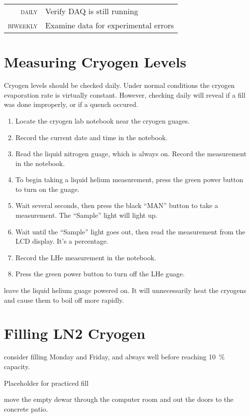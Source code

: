\begin{table}[h]\begin{tabular}{>{\scshape}r p{\textwidth}}
    daily & Verify DAQ is still running\\
    biweekly & Examine data for experimental errors
\end{tabular}\end{table}

\section{Measuring Cryogen Levels}
\label{sec:op_maintenance:cryogen_levels}

Cryogen levels should be checked daily.  Under normal conditions the cryogen evaporation rate is virtually constant.  However, checking daily will reveal if a fill was done improperly, or if a \gls{quench} occured.  

\begin{enumerate}
\item Locate the cryogen lab notebook near the cryogen guages.
\item Record the current date and time in the notebook.
\item Read the liquid nitrogen guage, which is always on.  Record the measurement in the notebook.
\item To begin taking a liquid helium measurement, press the green power button to turn on the guage.
\item Wait several seconds, then press the black ``MAN'' button to take a measurement.  The ``Sample'' light will light up.
\item Wait until the ``Sample'' light goes out, then read the measurement from the LCD display.  It's a percentage.
\item Record the LHe measurement in the notebook.
\item Press the green power button to turn off the LHe guage.
\end{enumerate}

\begin{pleasedonot}
  leave the liquid helium guage powered on.  It will unnecessarily heat the cryogens and cause them to boil off more rapidly.
\end{pleasedonot}

\section{Filling LN2 Cryogen}
\label{sec:op_maintenance:filling_ln2}
\begin{pleasedo} consider filling Monday and Friday, and always well before reaching 10~\% capacity. \end{pleasedo}
\FIXME Placeholder for practiced fill
\begin{pleasedo} move the empty dewar through the computer room and out the doors to the concrete patio. \end{pleasedo}

